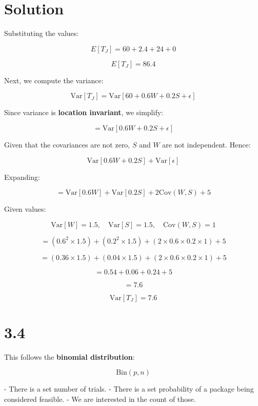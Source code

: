 \documentclass{../harvardml}
\theoremstyle{definition}
\theoremstyle{plain}
\newenvironment{solution}
  {\color{blue}\section*{Solution}}
{}
\begin{document}
\begin{solution}
Substituting the values:

\[
E[T_J] = 60 + 2.4 + 24 + 0
\]

\[
\boxed{E[T_J] = 86.4}
\]

Next, we compute the variance:

\[
\text{Var}[T_J] = \text{Var}[60 + 0.6W + 0.2S + \epsilon]
\]

Since variance is \textbf{location invariant}, we simplify:

\[
= \text{Var}[0.6W + 0.2S + \epsilon]
\]

Given that the covariances are not zero, \( S \) and \( W \) are not independent. Hence:

\[
\text{Var}[0.6W + 0.2S] + \text{Var}[\epsilon]
\]

Expanding:

\[
= \text{Var}[0.6W] + \text{Var}[0.2S] + 2\text{Cov}(W, S) + 5
\]

Given values:

\[
\text{Var}[W] = 1.5, \quad \text{Var}[S] = 1.5, \quad \text{Cov}(W, S) = 1
\]

\[
= (0.6^2 \times 1.5) + (0.2^2 \times 1.5) + (2 \times 0.6 \times 0.2 \times 1) + 5
\]

\[
= (0.36 \times 1.5) + (0.04 \times 1.5) + (2 \times 0.6 \times 0.2 \times 1) + 5
\]

\[
= 0.54 + 0.06 + 0.24 + 5
\]

\[
= 7.6
\]

\[
\boxed{\text{Var}[T_J] = 7.6}
\]

\section*{3.4}
This follows the \textbf{binomial distribution}:

\[
\text{Bin}(p, n)
\]

- There is a set number of trials.
- There is a set probability of a package being considered feasible.
- We are interested in the count of those.

\end{solution} 

\newpage 
\end{document}
